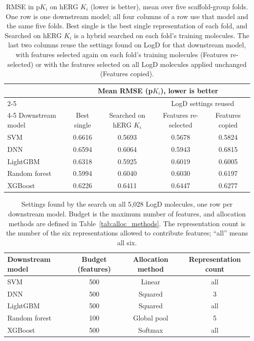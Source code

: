 \begin{table}[htbp]
\centering
\small
\begin{tabular}{@{}lcccc@{}}
\toprule
 & \multicolumn{4}{c}{Mean RMSE (p$K_i$), lower is better} \\
\cmidrule(l){2-5}
 & & & \multicolumn{2}{c}{LogD settings reused} \\
\cmidrule(l){4-5}
Downstream model & Best single & Searched on hERG $K_i$ & Features re-selected & Features copied \\
\midrule
SVM & 0.6616 & 0.5693 & 0.5678 & 0.5824 \\
DNN & 0.6594 & 0.6064 & 0.5943 & 0.6815 \\
LightGBM & 0.6318 & 0.5925 & 0.6019 & 0.6005 \\
Random forest & 0.5994 & 0.6040 & 0.6030 & 0.6197 \\
XGBoost & 0.6226 & 0.6411 & 0.6447 & 0.6277 \\
\bottomrule
\end{tabular}
\caption[Reusing search settings from LogD on hERG $K_i$.]{RMSE in p$K_i$ on hERG $K_i$ (lower is better), mean over five scaffold-group folds. One row is one downstream model; all four columns of a row use that model and the same five folds. Best single is the best single representation of each fold, and Searched on hERG $K_i$ is a hybrid searched on each fold's training molecules. The last two columns reuse the settings found on LogD for that downstream model, with features selected again on each fold's training molecules (Features re-selected) or with the features selected on all LogD molecules applied unchanged (Features copied).}
\label{tab:prelim_transfer}
\end{table}

\begin{table}[htbp]
\centering
\small
\begin{tabular}{@{}lccc@{}}
\toprule
Downstream model & Budget (features) & Allocation method & Representation count \\
\midrule
SVM & 500 & Linear & all \\
DNN & 500 & Squared & 3 \\
LightGBM & 500 & Squared & all \\
Random forest & 100 & Global pool & 5 \\
XGBoost & 500 & Softmax & all \\
\bottomrule
\end{tabular}
\caption[Search settings found on LogD.]{Settings found by the search on all 5,028 LogD molecules, one row per downstream model. Budget is the maximum number of features, and allocation methods are defined in Table~\ref{tab:alloc_methods}. The representation count is the number of the six representations allowed to contribute features; ``all'' means all six.}
\label{tab:prelim_transfer_settings}
\end{table}

